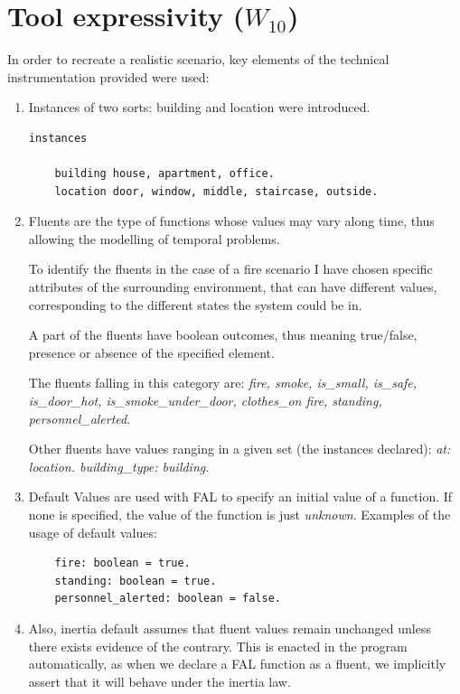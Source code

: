 \documentclass[a4paper,12pt]{report}
\begin{document}
\chapter{Tool expressivity ($W_{10}$)}


In order to recreate a realistic scenario, key elements of the technical instrumentation provided were used:
\begin{enumerate}
\item {\color{Red}Instances} of two sorts: building and location were introduced.
\begin{verbatim}
instances

	building house, apartment, office.
	location door, window, middle, staircase, outside.

\end{verbatim}

\item {\color{Red} Fluents} are the type of functions whose values may vary along time, thus allowing the modelling of temporal problems.
 
To identify the fluents in the case of a fire scenario I have chosen specific attributes of the surrounding environment, that can have different values, corresponding to the different states the system could be in. 

A part of the fluents have boolean outcomes, thus meaning true/false, presence or absence of the specified element.

The fluents falling in this category are: 
{\it fire, smoke, is\_small, is\_safe, is\_door\_hot, is\_smoke\_under\_door, clothes\_on fire, standing, personnel\_alerted}.

Other fluents have values ranging in a given set (the instances declared): {\it at: location.  building\_type: building}.

\item 
{\color{Red} Default Values} are used with FAL to specify an initial value of a function. 
If none is specified, the value of the function is just {\it unknown}.
Examples of the usage of default values:
\begin{verbatim}
	fire: boolean = true.
	standing: boolean = true.
	personnel_alerted: boolean = false.
\end{verbatim}

\item Also, {\color {Red} inertia default} assumes that fluent values remain unchanged unless there exists evidence of the contrary.
This is enacted in the program automatically, as when we declare a FAL function as a fluent, we implicitly assert that it will behave under the inertia law.



\end{enumerate}
\end{document}
